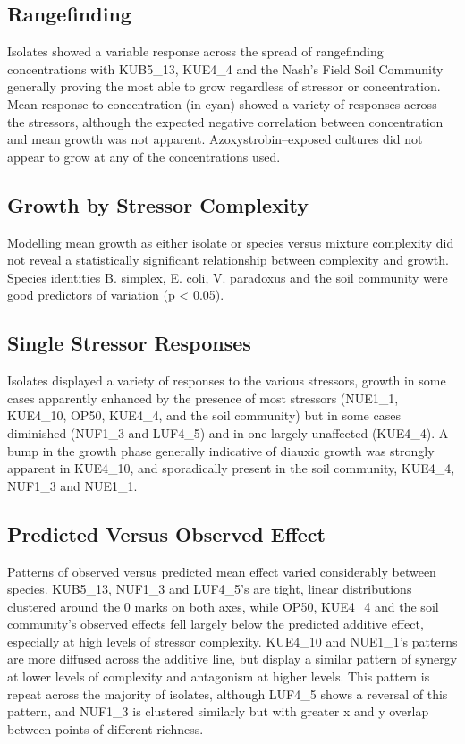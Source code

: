 \documentclass[review,12pt]{elsarticle}
\begin{document}
\subsection{Rangefinding}
\label{S:3:1}

Isolates showed a variable response across the spread of rangefinding concentrations with KUB5\_13, KUE4\_4 and the Nash's Field Soil Community generally proving the most able to grow regardless of stressor or concentration. Mean response to concentration (in cyan) showed a variety of responses across the stressors, although the expected negative correlation between concentration and mean growth was not apparent. Azoxystrobin--exposed cultures did not appear to grow at any of the concentrations used.

\subsection{Growth by Stressor Complexity}
\label{S:3:2}

Modelling mean growth as either isolate or species versus mixture complexity did not reveal a statistically significant relationship between complexity and growth. Species identities B. simplex, E. coli, V. paradoxus and the soil community were good predictors of variation (p < 0.05).

\subsection{Single Stressor Responses}
\label{S:3:3}

Isolates displayed a variety of responses to the various stressors, growth in some cases apparently enhanced by the presence of most stressors (NUE1\_1, KUE4\_10, OP50, KUE4\_4, and the soil community) but in some cases diminished (NUF1\_3 and LUF4\_5) and in one largely unaffected (KUE4\_4). A bump in  the growth phase generally indicative of diauxic growth was strongly apparent in KUE4\_10, and sporadically present in the soil community, KUE4\_4, NUF1\_3 and NUE1\_1. 

\subsection{Predicted Versus Observed Effect}
\label{S:3:4}

Patterns of observed versus predicted mean effect varied considerably between species. KUB5\_13, NUF1\_3 and LUF4\_5’s are tight, linear distributions clustered around the 0 marks on both axes, while OP50, KUE4\_4 and the soil community’s observed effects fell largely below the predicted additive effect, especially at high levels of stressor complexity. KUE4\_10 and NUE1\_1’s patterns are more diffused across the additive line, but display a similar pattern of synergy at lower levels of complexity and antagonism at higher levels. This pattern is repeat across the majority of isolates, although LUF4\_5 shows a reversal of this pattern, and NUF1\_3 is clustered similarly but with greater x and y overlap between points of different richness.
\end{document}
